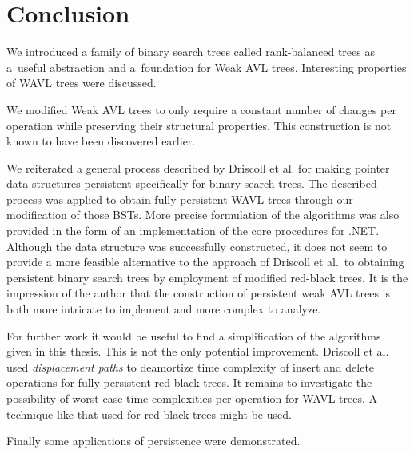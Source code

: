 \chapter*{Conclusion}

We introduced a family of binary search trees called rank-balanced trees as a~useful abstraction and a~foundation for Weak AVL trees. Interesting properties of WAVL trees were discussed.

We modified Weak AVL trees to only require a constant number of changes per operation while preserving their structural properties. 
This construction is not known to have been discovered earlier.

We reiterated a general process described by Driscoll et al. \cite{persistence-DSST} for making pointer data structures persistent specifically for binary search trees. 
The described process was applied to obtain fully-persistent WAVL trees through our modification of those BSTs. 
More precise formulation of the algorithms was also provided in the form of an implementation of the core procedures for .NET. 
Although the data structure was successfully constructed, 
it does not seem to provide a more feasible alternative to the approach of Driscoll et al.~to obtaining persistent binary search trees by employment of modified red-black trees. 
It is the impression of the author that the construction of persistent weak AVL trees is both more intricate to implement and more complex to analyze.

For further work it would be useful to find a simplification of the algorithms given in this thesis. This is not the only potential improvement.
Driscoll et al. used \textit{displacement paths} to deamortize time complexity of insert and delete operations for fully-persistent red-black trees. 
It remains to investigate the possibility of worst-case time complexities per operation for WAVL trees. A technique like that used for red-black trees might be used.

Finally some applications of persistence were demonstrated.
